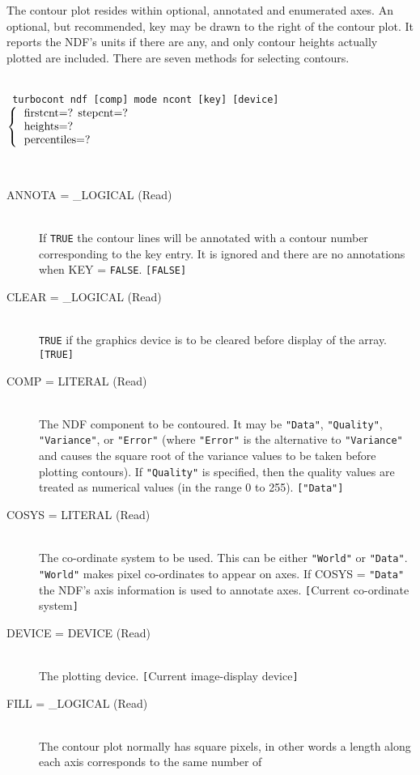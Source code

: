 \documentclass[twoside,11pt]{article}
\newcommand{\htmlref}[2]{#1}
\newcommand{\sstusage}[1]{\pagebreak[3] \item[Usage:] \mbox{} \\[1.3ex] {\ssttt #1}}
\newcommand{\sstparameters}[1]{
   \goodbreak
   \item[Parameters:] \mbox{} \\
   \vspace{-3.5ex}
   \begin{description}
      #1
   \end{description}
}
\newcommand{\sstsubsection}[1]{ \item[{#1}] \mbox{} \\}
\newcommand{\ssttt}{\tt}
\newcommand{\sstusage}[1]{%
      \item[\htmlref{Usage:}{ap:usage}] \mbox{}
      {\ssttt #1}\smallskip%
   }
\newcommand{\sstparameters}[1]{
      \item[\htmlref{Parameters:}{se:param}]
      \begin{description}
         #1
      \end{description}
   }
\newcommand{\sstsubsection}[1]{\item[{#1}]}
\begin{document}
{{      The contour plot resides within optional, annotated and enumerated
      axes.  An optional, but recommended, key may be drawn to the
      right of the contour plot.  It reports the NDF's units if there
      are any, and only contour heights actually plotted are included.
      There are seven methods for selecting contours.
   }
   \sstusage{
      turbocont ndf [comp] mode ncont [key] [device]
        $\left\{ {\begin{tabular}{l}
                    firstcnt=? stepcnt=? \\
                    heights=? \\
                    percentiles=?
                   \end{tabular} }
        \right.$
        \newline\hspace*{23.3em}
        \makebox[0mm][c]{\small mode}
   }
   \sstparameters{
      \sstsubsection{
         ANNOTA = \_LOGICAL (Read)
      }{
         If {\tt TRUE} the contour lines will be annotated with a contour
         number corresponding to the key entry.  It is ignored and there
         are no annotations when KEY = {\tt FALSE}.  {\tt [FALSE]}
      }
      \sstsubsection{
         CLEAR = \_LOGICAL (Read)
      }{
         {\tt TRUE} if the graphics device is to be cleared before display
         of the array. {\tt [TRUE]}
      }
      \sstsubsection{
         COMP = LITERAL (Read)
      }{
         The NDF component to be contoured.  It may be {\tt "Data"},
         {\tt "Quality"}, {\tt "Variance"}, or {\tt "Error"} (where
         {\tt "Error"} is the alternative to {\tt "Variance"} and causes
         the square root of the variance values to be taken before
         plotting contours).  If {\tt "Quality"} is specified, then
         the quality values are treated as numerical values (in the
         range 0 to 255).  {\tt ["Data"]}
      }
      \sstsubsection{
         COSYS = LITERAL (Read)
      }{
         The co-ordinate system to be used.  This can be either {\tt "World"}
         or {\tt "Data"}.  {\tt "World"} makes pixel co-ordinates to appear on axes.
         If COSYS = {\tt "Data"} the NDF's axis information is used to
         annotate axes.  {\tt [}Current co-ordinate system{\tt ]}
      }
      \sstsubsection{
         DEVICE = DEVICE (Read)
      }{
         The plotting device. {\tt [}Current image-display device{\tt ]}
      }
      \sstsubsection{
         FILL = \_LOGICAL (Read)
      }{
         The contour plot normally has square pixels, in other words
         a length along each axis corresponds to the same number of
}}}
\end{document}
